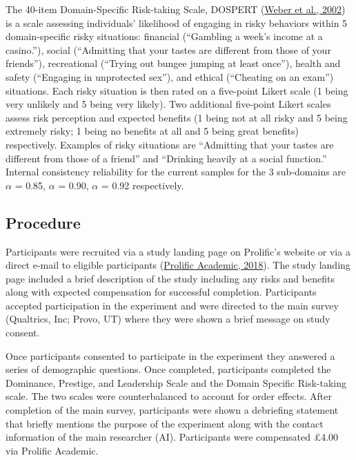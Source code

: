 \documentclass[
  donotrepeattitle,doc, 12pt, a4paper,floatsintext]{apa7}
\begin{document}
The 40-item Domain-Specific Risk-taking Scale, DOSPERT (\protect\hyperlink{ref-weber2002}{Weber et al., 2002}) is a scale assessing individuals' likelihood of engaging in risky behaviors within 5 domain-specific risky situations: financial (``Gambling a week's income at a casino.''), social (``Admitting that your tastes are different from those of your friends''), recreational (``Trying out bungee jumping at least once''), health and safety (``Engaging in unprotected sex''), and ethical (``Cheating on an exam'') situations. Each risky situation is then rated on a five-point Likert scale (1 being very unlikely and 5 being very likely). Two additional five-point Likert scales assess risk perception and expected benefits (1 being not at all risky and 5 being extremely risky; 1 being no benefits at all and 5 being great benefits) respectively. Examples of risky situations are ``Admitting that your tastes are different from those of a friend'' and ``Drinking heavily at a social function.'' Internal consistency reliability for the current samples for the 3 sub-domains are \(\alpha\) = 0.85, \(\alpha\) = 0.90, \(\alpha\) = 0.92 respectively.

\hypertarget{procedure}{%
\subsection{Procedure}\label{procedure}}

Participants were recruited via a study landing page on Prolific's website or via a direct e-mail to eligible participants (\protect\hyperlink{ref-prolificacademic2018}{Prolific Academic, 2018}). The study landing page included a brief description of the study including any risks and benefits along with expected compensation for successful completion. Participants accepted participation in the experiment and were directed to the main survey (Qualtrics, Inc; Provo, UT) where they were shown a brief message on study consent.

Once participants consented to participate in the experiment they answered a series of demographic questions. Once completed, participants completed the Dominance, Prestige, and Leadership Scale and the Domain Specific Risk-taking scale. The two scales were counterbalanced to account for order effects. After completion of the main survey, participants were shown a debriefing statement that briefly mentions the purpose of the experiment along with the contact information of the main researcher (AI). Participants were compensated £4.00 via Prolific Academic.
\end{document}
